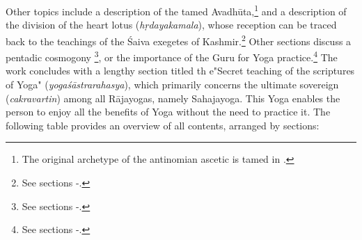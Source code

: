 Other topics include a description of the tamed Avadhūta,\footnote{The original archetype of the antinomian ascetic is tamed in .} and a description of the division of the heart lotus (\textit{hṛdayakamala}), whose reception can be traced back to the teachings of the Śaiva exegetes of Kashmir.\footnote{See sections -.} Other sections discuss a pentadic cosmogony \footnote{See sections -.}, or the importance of the Guru for Yoga practice.\footnote{See sections -.} The work concludes with a lengthy section titled th e"Secret teaching of the scriptures of Yoga" (\textit{yogaśāstrarahasya}), which primarily concerns the ultimate sovereign (\textit{cakravartin}) among all Rājayogas, namely Sahajayoga. This Yoga enables the person to enjoy all the benefits of Yoga without the need to practice it. The following table provides an overview of all contents, arranged by sections:

